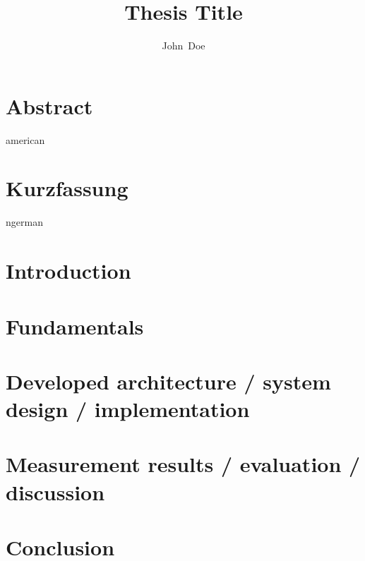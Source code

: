 \documentclass[]{thesis-style}
\author{John~Doe}
\title{Thesis Title}
\begin{document}
\maketitle
\tableofcontents
{}

\chapter*{Abstract}
\begin{otherlanguage*}{american}
\end{otherlanguage*}

\chapter*{Kurzfassung}
\begin{otherlanguage*}{ngerman}
\end{otherlanguage*}
\acresetall%

\chapter{Introduction}
\chapter{Fundamentals}
\chapter{Developed architecture / system design / implementation}
\chapter{Measurement results / evaluation / discussion}
\chapter{Conclusion}

\cleardoublepage%

\listofabbreviations
\clearpage

\listoffigures
\clearpage

\listoftables
\clearpage



\end{document}
